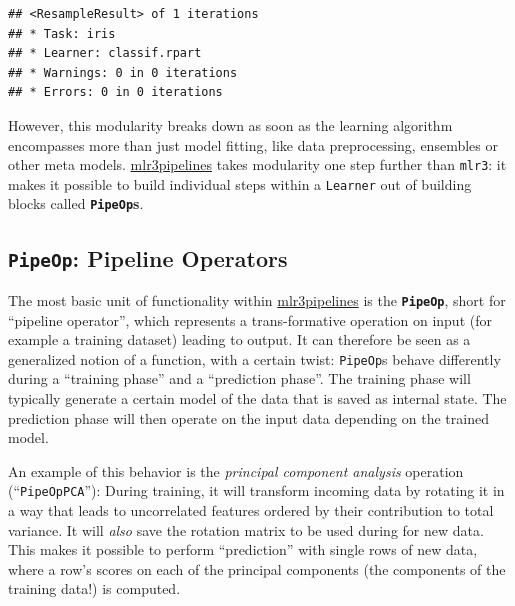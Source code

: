 \documentclass[
]{scrbook}
\newenvironment{Shaded}{\begin{snugshade}}{\end{snugshade}}
\newcommand{\DecValTok}[1]{\textcolor[rgb]{0.00,0.00,0.81}{#1}}
\newcommand{\FunctionTok}[1]{\textcolor[rgb]{0.00,0.00,0.00}{#1}}
\newcommand{\NormalTok}[1]{#1}
\newcommand{\OtherTok}[1]{\textcolor[rgb]{0.56,0.35,0.01}{#1}}
\newcommand{\SpecialCharTok}[1]{\textcolor[rgb]{0.00,0.00,0.00}{#1}}
\newcommand{\StringTok}[1]{\textcolor[rgb]{0.31,0.60,0.02}{#1}}
\renewenvironment{Shaded} {\begin{snugshade}\small} {\end{snugshade}}
\begin{document}
\begin{verbatim}
## <ResampleResult> of 1 iterations
## * Task: iris
## * Learner: classif.rpart
## * Warnings: 0 in 0 iterations
## * Errors: 0 in 0 iterations
\end{verbatim}

However, this modularity breaks down as soon as the learning algorithm encompasses more than just model fitting, like data preprocessing, ensembles or other meta models.
\href{https://cran.r-project.org/package=mlr3pipelines}{mlr3pipelines} takes modularity one step further than \texttt{mlr3}: it makes it possible to build individual steps within a \texttt{Learner} out of building blocks called \textbf{\texttt{PipeOp}s}.

\hypertarget{pipeop-pipeline-operators}{%
\subsection{\texorpdfstring{\texttt{PipeOp}: Pipeline Operators}{PipeOp: Pipeline Operators}}\label{pipeop-pipeline-operators}}

The most basic unit of functionality within \href{https://cran.r-project.org/package=mlr3pipelines}{mlr3pipelines} is the \textbf{\texttt{PipeOp}}, short for ``pipeline operator'', which represents a trans-formative operation on input (for example a training dataset) leading to output.
It can therefore be seen as a generalized notion of a function, with a certain twist: \texttt{PipeOp}s behave differently during a ``training phase'' and a ``prediction phase''.
The training phase will typically generate a certain model of the data that is saved as internal state.
The prediction phase will then operate on the input data depending on the trained model.

An example of this behavior is the \emph{principal component analysis} operation (``\texttt{PipeOpPCA}''):
During training, it will transform incoming data by rotating it in a way that leads to uncorrelated features ordered by their contribution to total variance.
It will \emph{also} save the rotation matrix to be used during for new data.
This makes it possible to perform ``prediction'' with single rows of new data, where a row's scores on each of the principal components (the components of the training data!) is computed.

\begin{Shaded}
\end{Shaded}
\end{document}
